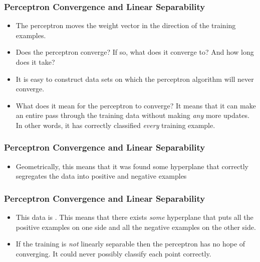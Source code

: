 \documentclass[trans]{beamer}
\begin{document}
\begin{frame}
  \frametitle{Perceptron Convergence and Linear Separability}
\begin{itemize}
\item
The perceptron moves the weight vector in the direction of the training
examples.  
\item Does the
perceptron converge?  If so, what does it converge to?  And how long
does it take?
\item
It is easy to construct data sets on which the perceptron algorithm
will never converge. 
%
%
%
\item What does it mean for the perceptron to converge?  It means that it
can make an entire pass through the training data without making
\emph{any} more updates.  In other words, it has correctly classified
\emph{every} training example.
\end{itemize}
\end{frame}
\begin{frame}
  \frametitle{Perceptron Convergence and Linear Separability}
\begin{itemize}
\item
  Geometrically, this means that it was
found some hyperplane that correctly segregates the data into positive
and negative examples
\end{itemize}
\end{frame}
\begin{frame}
  \frametitle{Perceptron Convergence and Linear Separability}
\begin{itemize}
\item
This data is .  This means
that there exists \emph{some} hyperplane that puts all the positive
examples on one side and all the negative examples on the other side.
\item 
If the training is \emph{not} linearly separable  then the perceptron has no hope of
converging.  It could never possibly classify each point correctly.
\end{itemize}

\end{frame}
\end{document}
